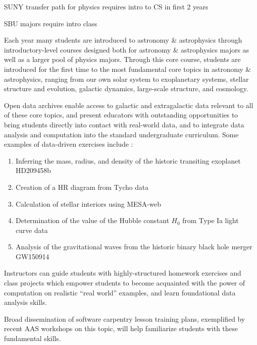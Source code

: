 \documentclass[11pt]{article}
\begin{document}
SUNY transfer path for physics requires intro to CS in first 2 years

 SBU majors require intro class

Each year many students are introduced to astronomy \& astrophysics through
introductory-level courses designed both for astronomy \& astrophysics majors
as well as a larger pool of physics majors. Through this core course, students
are introduced for the first time to the most fundamental core topics in astronomy 
\& astrophysics, ranging from our own solar system to exoplanetary systems, 
stellar structure and evolution, galactic dynamics, large-scale structure, and cosmology.

Open data archives enable access to galactic and extragalactic data relevant to all of these
core topics, and present educators with outstanding opportunities to bring students directly
into contact with real-world data, and to integrate data analysis  and computation into the
standard undergraduate curriculum. Some examples of data-driven exercises include :


\begin {enumerate} 

\item Inferring the mass, radius, and density of the historic transiting exoplanet HD209458b

\item Creation of a HR diagram from Tycho data

\item Calculation of stellar interiors using MESA-web

\item Determination of the value of the Hubble constant $H_0$ from Type Ia light curve data

\item Analysis of the gravitational waves from the historic binary black hole merger GW150914

\end {enumerate}

Instructors can guide students with highly-structured homework exercises and class projects which 
empower students to become acquainted with the power of computation on realistic ``real world''
examples, and learn foundational data analysis skills.  

Broad dissemination of software carpentry lesson training plans, exemplified
by recent AAS workshops on this topic, will help familiarize students with 
these fundamental skills. 
\end{document}
